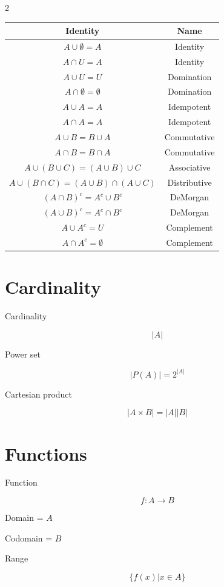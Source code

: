 \documentclass[9pt]{article}
\begin{document}
\begin{multicols}{2}
\begin{tabular}{|c|c|}
\hline
Identity & Name\\
\hline
$A\cup \emptyset=A$ & Identity\\
$A\cap U=A$ & Identity\\
\hline
$A\cup U=U$ & Domination\\
$A\cap\emptyset=\emptyset$ & Domination\\
\hline
$A\cup A=A$ & Idempotent\\
$A\cap A=A$ & Idempotent\\
\hline
$A\cup B=B\cup A$ & Commutative\\
$A\cap B=B\cap A$ & Commutative\\
\hline
$A\cup(B\cup C)=(A\cup B)\cup C$ & Associative\\
\hline
$A\cup(B\cap C)=(A\cup B)\cap(A\cup C)$ & Distributive\\
\hline
$(A\cap B)^c=A^c\cup B^c$ & DeMorgan\\
$(A\cup B)^c=A^c\cap B^c$ & DeMorgan\\
\hline
$A\cup A^c=U$ & Complement\\
$A\cap A^c=\emptyset$ & Complement\\
\hline
\end{tabular}

\section*{Cardinality}

Cardinality

\[
|A|
\]

Power set

\[
|P(A)|=2^{|A|}
\]

Cartesian product

\[
|A\times B|=|A||B|
\]

\section*{Functions}

Function

\[
f:A\to B
\]

Domain = $A$

Codomain = $B$

Range

\[
\{f(x)|x\in A\}
\]


\end{multicols}
\end{document}
